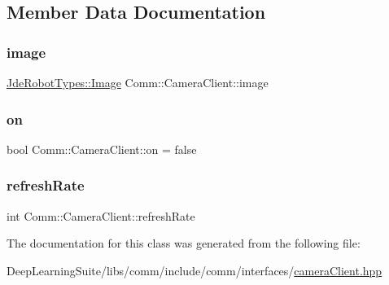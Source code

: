 \subsection{Member Data Documentation}
\mbox{\label{class_comm_1_1_camera_client_a401c8c553be78d6479668490768d5d72}} 
\subsubsection{\texorpdfstring{image}{image}}
{\footnotesize\ttfamily \hyperlink{class_jde_robot_types_1_1_image}{Jde\+Robot\+Types\+::\+Image} Comm\+::\+Camera\+Client\+::image\hspace{0.3cm}{\ttfamily [protected]}}

\mbox{\label{class_comm_1_1_camera_client_a72b2845560d1aa56b52cd8d8c191645a}} 
\subsubsection{\texorpdfstring{on}{on}}
{\footnotesize\ttfamily bool Comm\+::\+Camera\+Client\+::on = false}

\mbox{\label{class_comm_1_1_camera_client_ac5499dca33e4d1bfd11f1ad1143bc8f6}} 
\subsubsection{\texorpdfstring{refresh\+Rate}{refreshRate}}
{\footnotesize\ttfamily int Comm\+::\+Camera\+Client\+::refresh\+Rate\hspace{0.3cm}{\ttfamily [protected]}}



The documentation for this class was generated from the following file\+:\begin{DoxyCompactItemize}
\item 
Deep\+Learning\+Suite/libs/comm/include/comm/interfaces/\hyperlink{interfaces_2camera_client_8hpp}{camera\+Client.\+hpp}\end{DoxyCompactItemize}
